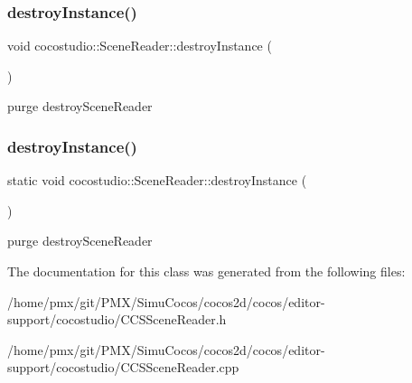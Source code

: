 \subsubsection{\texorpdfstring{destroy\+Instance()}{destroyInstance()}\hspace{0.1cm}{\footnotesize\ttfamily [1/2]}}
{\footnotesize\ttfamily void cocostudio\+::\+Scene\+Reader\+::destroy\+Instance (\begin{DoxyParamCaption}{ }\end{DoxyParamCaption})\hspace{0.3cm}{\ttfamily [static]}}

purge  destroy\+Scene\+Reader \mbox{\label{classcocostudio_1_1SceneReader_ade5aa96936540c45b1ceeba0b9847fc5}} 
\subsubsection{\texorpdfstring{destroy\+Instance()}{destroyInstance()}\hspace{0.1cm}{\footnotesize\ttfamily [2/2]}}
{\footnotesize\ttfamily static void cocostudio\+::\+Scene\+Reader\+::destroy\+Instance (\begin{DoxyParamCaption}{ }\end{DoxyParamCaption})\hspace{0.3cm}{\ttfamily [static]}}

purge  destroy\+Scene\+Reader 

The documentation for this class was generated from the following files\+:\begin{DoxyCompactItemize}
\item 
/home/pmx/git/\+P\+M\+X/\+Simu\+Cocos/cocos2d/cocos/editor-\/support/cocostudio/C\+C\+S\+Scene\+Reader.\+h\item 
/home/pmx/git/\+P\+M\+X/\+Simu\+Cocos/cocos2d/cocos/editor-\/support/cocostudio/C\+C\+S\+Scene\+Reader.\+cpp\end{DoxyCompactItemize}
